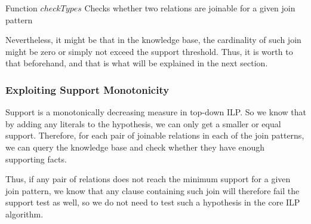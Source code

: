 \begin{algorithm}[h!]
  \caption{Function $checkTypes$ \newline Checks whether two relations are joinable for a given join pattern}
 \label{alg1}
   {
  }
   {
  }
\end{algorithm}

Nevertheless, it might be that in the knowledge base, the cardinality of such join might be zero or simply not exceed
the support threshold. Thus, it is worth to that beforehand, and that is what will be explained in the next section.

\subsubsection{Exploiting Support Monotonicity}

Support is a monotonically decreasing measure in top-down ILP. So we know that by adding any
literals to the hypothesis, we can only get a smaller or equal support. Therefore, for each pair of joinable relations
in each of the join patterns, we can query the knowledge base and check whether they have enough supporting facts.

Thus, if any pair of relations does not reach the minimum support for a given join pattern, we know that any clause
containing such join will therefore fail the support test as well, so we do not need to test such a hypothesis in the
core ILP algorithm.

